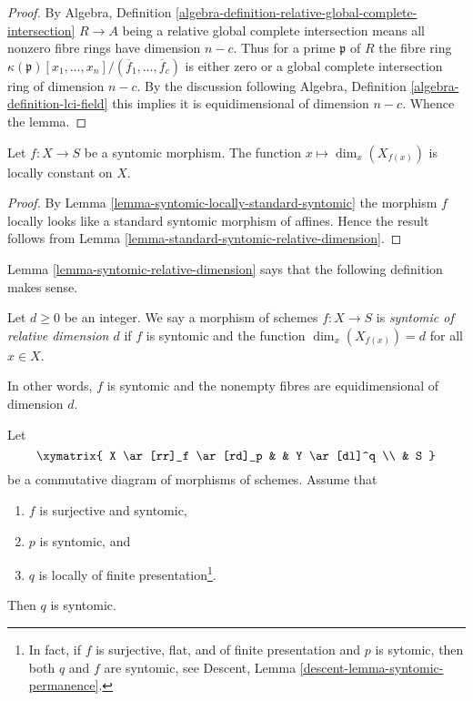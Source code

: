 \begin{proof}
By Algebra,
Definition \ref{algebra-definition-relative-global-complete-intersection}
$R \to A$ being a relative global complete intersection means
all nonzero fibre rings have dimension $n - c$.
Thus for a prime $\mathfrak p$ of $R$ the fibre ring
$\kappa(\mathfrak p)[x_1, \ldots, x_n]/(\overline{f}_1, \ldots, \overline{f}_c)$
is either zero or a global complete intersection ring of dimension $n - c$.
By the discussion following
Algebra, Definition \ref{algebra-definition-lci-field}
this implies it is equidimensional of dimension $n - c$.
Whence the lemma.
\end{proof}

\begin{lemma}
\label{lemma-syntomic-relative-dimension}
Let $f : X \to S$ be a syntomic morphism. The function
$x \mapsto \dim_x(X_{f(x)})$ is locally constant on $X$.
\end{lemma}

\begin{proof}
By Lemma \ref{lemma-syntomic-locally-standard-syntomic}
the morphism $f$ locally looks like a standard
syntomic morphism of affines. Hence the result follows
from Lemma \ref{lemma-standard-syntomic-relative-dimension}.
\end{proof}

\noindent
Lemma \ref{lemma-syntomic-relative-dimension}
says that the following definition makes sense.

\begin{definition}
\label{definition-syntomic-relative-dimension}
Let $d \geq 0$ be an integer. We say a morphism of schemes $f : X \to S$
is {\it syntomic of relative dimension $d$} if $f$ is syntomic and
the function $\dim_x(X_{f(x)}) = d$ for all $x \in X$.
\end{definition}

\noindent
In other words, $f$ is syntomic and the nonempty fibres are equidimensional
of dimension $d$.

\begin{lemma}
\label{lemma-syntomic-permanence}
Let
$$
\xymatrix{
X \ar[rr]_f \ar[rd]_p & &
Y \ar[dl]^q \\
& S
}
$$
be a commutative diagram of morphisms of schemes. Assume that
\begin{enumerate}
\item $f$ is surjective and syntomic,
\item $p$ is syntomic, and
\item $q$ is locally of finite presentation\footnote{In fact, if
$f$ is surjective, flat, and of finite presentation and $p$ is sytomic,
then both $q$ and $f$ are syntomic, see
Descent, Lemma \ref{descent-lemma-syntomic-permanence}.}.
\end{enumerate}
Then $q$ is syntomic.
\end{lemma}

